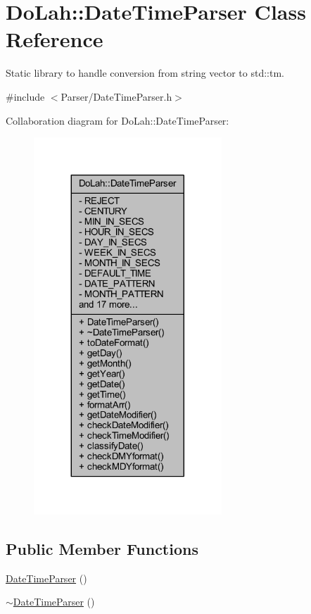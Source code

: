 \hypertarget{class_do_lah_1_1_date_time_parser}{}\section{Do\+Lah\+:\+:Date\+Time\+Parser Class Reference}
\label{class_do_lah_1_1_date_time_parser}


Static library to handle conversion from string vector to std\+::tm.  




{\ttfamily \#include $<$Parser/\+Date\+Time\+Parser.\+h$>$}



Collaboration diagram for Do\+Lah\+:\+:Date\+Time\+Parser\+:
\nopagebreak
\begin{figure}[H]
\begin{center}
\leavevmode
\includegraphics[width=200pt]{class_do_lah_1_1_date_time_parser__coll__graph}
\end{center}
\end{figure}
\subsection*{Public Member Functions}
\begin{DoxyCompactItemize}
\item 
\hyperlink{class_do_lah_1_1_date_time_parser_afbde4ac9bc1256361277129d68001b00}{Date\+Time\+Parser} ()
\item 
\hyperlink{class_do_lah_1_1_date_time_parser_addef73e210f968e6e07b1fef40d38113}{$\sim$\+Date\+Time\+Parser} ()
\end{DoxyCompactItemize}
